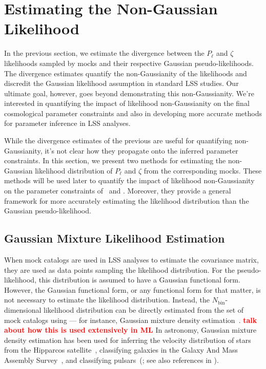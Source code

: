 \documentclass[12pt, letterpaper, preprint]{aastex}
\newcommand{\todo}[1]{{\bf \textcolor{red}{#1}}}
\newcommand{\Beut}{\citetalias{beutler2017}}
\newcommand{\Sinh}{\citetalias{sinha2017a}}
\begin{document}
\section{Estimating the Non-Gaussian Likelihood}
In the previous section, we estimate the divergence between the 
$P_\ell$ and $\zeta$ likelihoods sampled by mocks and their respective 
Gaussian pseudo-likelihoods. The divergence estimates quantify 
the non-Gaussianity of the likelihoods and discredit the 
Gaussian likelihood assumption in standard LSS studies. Our ultimate goal, 
however, goes beyond demonstrating this non-Gaussianity. We're interested 
in quantifying the impact of likelihood non-Gaussianity on the final 
cosmological parameter constraints and also in developing more accurate 
methods for parameter inference in LSS analyses.

While the divergence estimates of the previous are useful for 
quantifying non-Gaussianity, it's not clear how they propagate 
onto the inferred parameter constraints. In this section,
we present two methods for estimating the non-Gaussian likelihood 
distribution of $P_\ell$ and $\zeta$ from the corresponding mocks.
These methods will be used later to quantify the impact
of likelihood non-Gaussianity on the parameter constraints of 
\Beut~and \Sinh. Moreover, they provide a general framework for 
more accurately estimating the likelihood distribution than 
the Gaussian pseudo-likelihood. 

\subsection{Gaussian Mixture Likelihood Estimation}
When mock catalogs are used in LSS analyses to estimate the 
covariance matrix, they are used as data points sampling the 
likelihood distribution. For the pseudo-likelihood, 
this distribution is assumed to have a Gaussian functional form. 
However, the Gaussian functional form, or any functional form for 
that matter, is not necessary to estimate the likelihood distribution. 
Instead, the $N_\mathrm{bin}$-dimensional likelihood distribution 
can be directly estimated from the set of mock catalogs using --- for 
instance, Gaussian mixture density estimation~\citep{9780471006268}. 
\todo{talk about how this is used extensively in ML} 
In astronomy, Gaussian mixture density estimation has been used for 
inferring the velocity distribution of stars from the Hipparcos 
satellite~\citep{bovy2011}, classifying galaxies in the Galaxy And Mass Assembly 
Survey~\cite{taylor2015}, and classifying pulsars~(\cite{lee2012}; see
also references in \cite{kuhn2017}). 
\end{document}
